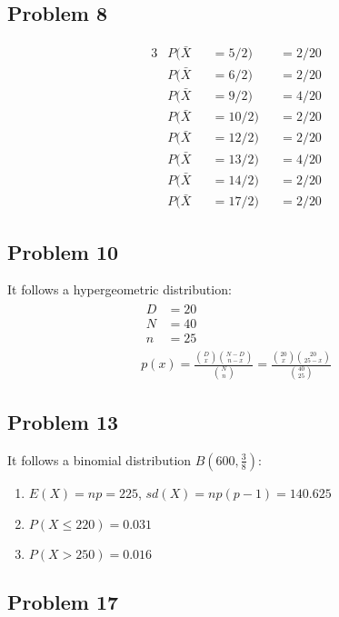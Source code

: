 \documentclass{article}
\begin{document}
\subsection*{Problem 8}

\begin{alignat*}{3}
	& P(\bar{X} &&= 5/2) &&= 2/20 \\
	& P(\bar{X} &&= 6/2) &&= 2/20 \\
	& P(\bar{X} &&= 9/2) &&= 4/20 \\
	& P(\bar{X} &&= 10/2) &&= 2/20 \\
	& P(\bar{X} &&= 12/2) &&= 2/20 \\
	& P(\bar{X} &&= 13/2) &&= 4/20 \\
	& P(\bar{X} &&= 14/2) &&= 2/20 \\
	& P(\bar{X} &&= 17/2) &&= 2/20
\end{alignat*}

\subsection*{Problem 10}

It follows a hypergeometric distribution:
\begin{gather*}
\begin{aligned}
	D &= 20 \\
	N &= 40 \\
	n &= 25
\end{aligned} \\
	p(x) = \frac{\binom{D}{x} \binom{N-D}{n-x}}{\binom{N}{n}}
	= \frac{\binom{20}{x} \binom{20}{25-x}}{\binom{40}{25}}
\end{gather*}

\subsection*{Problem 13}

It follows a binomial distribution $B(600, \frac{3}{8})$:

\begin{enumerate}
	\item $E(X) = np = 225$, $sd(X) = np(p-1) = 140.625$
	\item $P(X \le 220) = 0.031$
	\item $P(X > 250) = 0.016$
\end{enumerate}

\subsection*{Problem 17}
\end{document}
